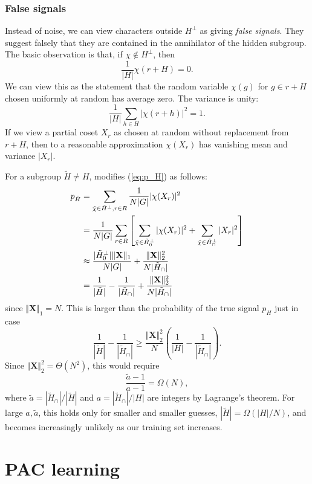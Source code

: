 \documentclass[aps, pre,reprint,nofootinbib,citeautoscript,floatfix]{revtex4-1}
\begin{document}
\subsubsection*{False signals}

Instead of noise, we can view characters outside $H^\perp$ as giving \emph{false signals}. They suggest falsely that they are contained in the annihilator of the hidden subgroup. The basic observation is that, if $\chi \notin H^\perp$, then
\[
\frac{1}{|H|}\chi(r + H) = 0.
\]
We can view this as the statement that the random variable $\chi(g)$ for $g \in r + H$ chosen uniformly at random has average zero. The variance is unity:
\[
\frac{1}{|H|}\sum_{h\in H}|\chi(r+h)|^2 = 1.
\]
If we view a partial coset $X_r$ as chosen at random without replacement from $r+H$, then to a reasonable approximation $\chi(X_r)$ has vanishing mean and variance $|X_r|$.

For a subgroup $\tilde{H} \neq H$, modifies (\ref{eq:p_H}) as follows:
\begin{align}
    p_{\tilde{H}} & = \sum_{\tilde{\chi}\in\tilde{H}^\perp, r\in R} \frac{1}{N|G|} |\chi(X_r)|^2 \notag \\
    & = \frac{1}{N|G|}\sum_{r\in R}\left[\sum_{\tilde{\chi}\in\tilde{H}^\perp_0} |\chi(X_r)|^2 + \sum_{\tilde{\chi}\in\tilde{H}^\perp_\cap}|X_r|^2\right] \notag \\
    & \approx \frac{|\tilde{H}^\perp_0|\Vert \mathbf{X}\Vert_1 }{N|G|} + \frac{\Vert \mathbf{X}\Vert_2^2}{N|\tilde{H}_\cap|} \notag \\
    & = \frac{1}{|\tilde{H}|} - \frac{1}{|\tilde{H}_\cap|} + \frac{\Vert \mathbf{X}\Vert_2^2}{N|\tilde{H}_\cap|}
\end{align}
since $\Vert \mathbf{X}\Vert_1 = N$.
This is larger than the probability of the true signal $p_H$ just in case
\[
\frac{1}{|\tilde{H}|} - \frac{1}{|\tilde{H}_\cap|} \geq \frac{\Vert \mathbf{X}\Vert_2^2}{N}\left(\frac{1}{|H|} - \frac{1}{|\tilde{H}_\cap|}\right).
\]
Since $\Vert \mathbf{X}\Vert_2^2 = \Theta(N^2)$, this would require
\[
\frac{\tilde{a}-1}{a - 1} = \Omega(N),
\]
where $\tilde{a}=|\tilde{H}_\cap|/|\tilde{H}|$ and $a=|\tilde{H}_\cap|/|H|$ are integers by Lagrange's theorem.
For large $a, \tilde{a}$, this holds only for smaller and smaller guesses, $|\tilde{H}|= \Omega(|H|/N)$, and becomes increasingly unlikely as our training set increases.

\section{PAC learning}
\label{sec:sample-eq}
\end{document}
